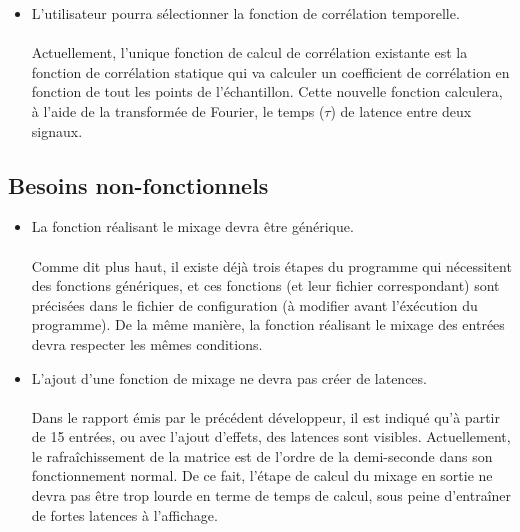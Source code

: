 \documentclass{article}
\begin{document}
\begin{itemize}
 \item L'utilisateur pourra sélectionner la fonction de corrélation temporelle.
       \paragraph{}
       Actuellement, l'unique fonction de calcul de corrélation existante est
       la fonction de corrélation statique qui va calculer un coefficient de corrélation
       en fonction de tout les points de l’échantillon. Cette nouvelle fonction
       calculera, à l'aide de la transformée de Fourier, le temps ($\tau$) de latence
       entre deux signaux.
       
       
\end{itemize}
\subsection{Besoins non-fonctionnels}
\begin{itemize}
 \item La fonction réalisant le mixage devra être générique.
       \paragraph{}
       Comme dit plus haut, il existe déjà trois étapes du programme qui
       nécessitent des fonctions génériques, et ces fonctions (et leur fichier
       correspondant) sont précisées dans le fichier de configuration (à
       modifier avant l'éxécution du programme). De la même manière, la
       fonction réalisant le mixage des entrées devra respecter les mêmes
       conditions.
 \item L'ajout d'une fonction de mixage ne devra pas créer de latences.
       \paragraph{}
       Dans le rapport émis par le précédent développeur, il est indiqué qu'à
       partir de 15 entrées, ou avec l'ajout d'effets, des latences sont
       visibles. Actuellement, le rafraîchissement de la matrice est de l'ordre
       de la demi-seconde dans son fonctionnement normal. De ce fait, l'étape
       de calcul du mixage en sortie ne devra pas être trop lourde en terme de
       temps de calcul, sous peine d'entraîner de fortes latences à l'affichage.
\end{itemize}
\end{document}
